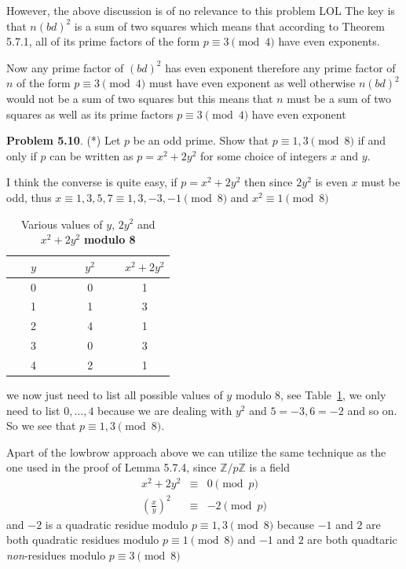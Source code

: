 \documentclass[aps,preprint,preprintnumbers,nofootinbib,showpacs,prd]{revtex4-1}
\newcommand{\nbea}{\begin{eqnarray*}}
\newcommand{\neea}{\end{eqnarray*}}
\begin{document}
However, the above discussion is of no relevance to this problem LOL The key is that $n(bd)^2$ is a sum of two squares which means that according to Theorem 5.7.1, all of its prime factors of the form $p \equiv 3 \pmod{4}$ have even exponents.

Now any prime factor of $(bd)^2$ has even exponent therefore any prime factor of $n$ of the form $p \equiv 3 \pmod{4}$ must have even exponent as well otherwise $n(bd)^2$ would not be a sum of two squares but this means that $n$ must be a sum of two squares as well as its prime factors $p \equiv 3 \pmod{4}$ have even exponent 

{\bf Problem 5.10}. (*) Let $p$ be an odd prime. Show that $p \equiv 1, 3 \pmod{8}$ if and only if $p$ can be written as $p = x^2 + 2y^2$ for some choice of integers $x$ and $y$.

I think the converse is quite easy, if $p = x^2 + 2y^2$ then since $2y^2$ is even $x$ must be odd, thus $x \equiv 1,3,5,7 \equiv 1,3,-3,-1 \pmod{8}$ and $x^2 \equiv 1 \pmod{8}$
%
\begin{table}[]
\centering
\caption{Various values of $y$, $2y^2$ and $x^2 + 2y^2$ {\bf modulo 8}}
\label{Tab:7}
\begin{tabular}{|c|c|c|}
\hline
~~~$y$~~~ & ~~~$y^2$~~~ & $x^2 + 2y^2$ \\ \hline
0 & 0 & 1 \\ \hline
1 & 1 & 3 \\ \hline
2 & 4 & 1 \\ \hline
3 & 0 & 3 \\ \hline
4 & 2 & 1 \\ \hline
\end{tabular}
\end{table}
%
we now just need to list all possible values of $y$ modulo 8, see Table~\ref{Tab:7}, we only need to list $0,\dots,4$ because we are dealing with $y^2$ and $5=-3, 6=-2$ and so on. So we see that $p \equiv 1,3 \pmod{8}$.

Apart of the lowbrow approach above we can utilize the same technique as the one used in the proof of Lemma 5.7.4, since $\mathbb{Z}/p\mathbb{Z}$ is a field
%
\nbea
x^2 + 2y^2 & \equiv & 0 \pmod{p} \\
\left ( \frac{x}{y}\right )^2 & \equiv & -2 \pmod{p}
\neea
%
and $-2$ is a quadratic residue modulo $p \equiv 1,3 \pmod{8}$ because $-1$ and $2$ are both quadratic residues modulo $p \equiv 1\pmod{8}$ and $-1$ and $2$ are both quadtaric {\it non}-residues modulo $p \equiv 3 \pmod{8}$
\end{document}
